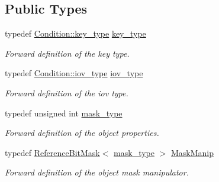 \subsection*{Public Types}
\begin{DoxyCompactItemize}
\item 
typedef \hyperlink{class_d_d4hep_1_1_conditions_1_1_condition_a7528efa762e8cc072ef80ea67c3531f9}{Condition::key\_\-type} \hyperlink{class_d_d4hep_1_1_conditions_1_1_interna_1_1_condition_object_a61a3251d047bd75dcdebb0e1c1409101}{key\_\-type}
\begin{DoxyCompactList}\small\item\em Forward definition of the key type. \item\end{DoxyCompactList}\item 
typedef \hyperlink{class_d_d4hep_1_1_i_o_v}{Condition::iov\_\-type} \hyperlink{class_d_d4hep_1_1_conditions_1_1_interna_1_1_condition_object_a6d54716450a73a1a439ca06445f56d24}{iov\_\-type}
\begin{DoxyCompactList}\small\item\em Forward definition of the iov type. \item\end{DoxyCompactList}\item 
typedef unsigned int \hyperlink{class_d_d4hep_1_1_conditions_1_1_interna_1_1_condition_object_a1a9ff63fe2e060b973e6c2994b0a1370}{mask\_\-type}
\begin{DoxyCompactList}\small\item\em Forward definition of the object properties. \item\end{DoxyCompactList}\item 
typedef \hyperlink{class_d_d4hep_1_1_reference_bit_mask}{ReferenceBitMask}$<$ \hyperlink{class_d_d4hep_1_1_conditions_1_1_interna_1_1_condition_object_a1a9ff63fe2e060b973e6c2994b0a1370}{mask\_\-type} $>$ \hyperlink{class_d_d4hep_1_1_conditions_1_1_interna_1_1_condition_object_a43dfd5df006474f17b7eba59b2f511fe}{MaskManip}
\begin{DoxyCompactList}\small\item\em Forward definition of the object mask manipulator. \item\end{DoxyCompactList}\end{DoxyCompactItemize}
